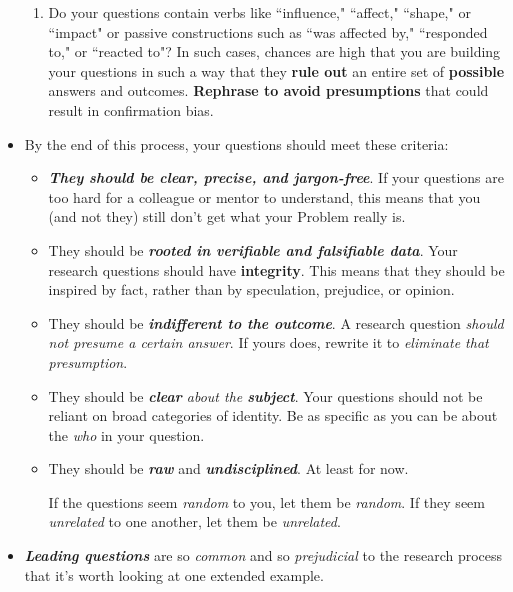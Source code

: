 \documentclass[11pt]{article}
\begin{document}
\begin{itemize}
\begin{exercise}
\begin{enumerate}
 \item Do your questions contain verbs like ``influence," ``affect," ``shape," or ``impact" or passive constructions such as ``was affected by," ``responded to," or ``reacted to"? In such cases, chances are high that you are building your questions in such a way that they \textbf{rule out} an
entire set of \textbf{possible} answers and outcomes. \textbf{Rephrase to avoid presumptions} that could result in confirmation bias.
\end{enumerate}
\end{exercise}

\item By the end of this process, your questions should meet these criteria:
\begin{itemize}
\item \textbf{\emph{They should be clear, precise, and jargon-free}}. If your questions are too hard for a colleague or mentor to understand, this means that you (and not they) still don’t get what your Problem really is.

\item They should be \textbf{\emph{rooted in verifiable and falsifiable data}}. Your research questions should have \textbf{integrity}. This means that they should be inspired by fact, rather than by speculation, prejudice, or opinion. 

\item They should be \emph{\textbf{indifferent to the outcome}}. A research question \emph{should not presume a certain answer}. If yours does, rewrite it to \emph{eliminate that presumption}.

\item They should be \emph{\textbf{clear} about the \textbf{subject}}. Your questions should not be reliant on broad categories of identity. Be as
specific as you can be about the \emph{who} in your question.

\item They should be \emph{\textbf{raw}} and \emph{\textbf{undisciplined}}. At least for now.

If the questions seem \emph{random} to you, let them be \emph{random}. If they seem \emph{unrelated} to one another, let them be \emph{unrelated}.
\end{itemize}

\item \emph{\textbf{Leading questions}} are so \emph{common} and so \emph{prejudicial} to the research process that it’s worth looking at one extended example. 


\end{itemize}
\end{document}
